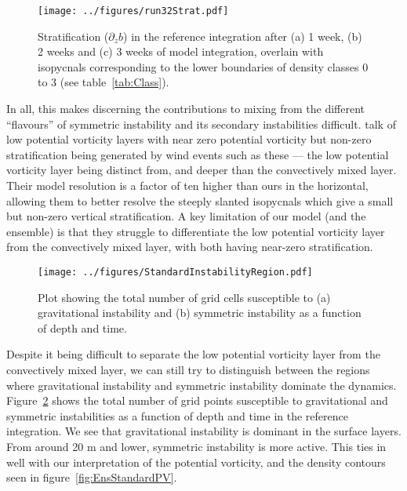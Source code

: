 
\begin{figure} 
    \centering
    \texttt{[image: ../figures/run32Strat.pdf]}
    \caption{Stratification ($\partial_z b$) in the reference integration after (a) 1 week, (b) 2 weeks and (c) 3 weeks of model integration, overlain with isopycnals corresponding to the lower boundaries of density classes 0 to 3 (see table~\ref{tab:Class}).}
    \label{fig:EnsStandardStrat}
\end{figure}

In all, this makes discerning the contributions to mixing from the different ``flavours'' of symmetric instability and its secondary instabilities difficult. \citet{Taylor2010} talk of low potential vorticity layers with near zero potential vorticity but non-zero stratification being generated by wind events such as these --- the low potential vorticity layer being distinct from, and deeper than the convectively mixed layer. Their model resolution is a factor of ten higher than ours in the horizontal, allowing them to better resolve the steeply slanted isopycnals which give a small but non-zero vertical stratification. A key limitation of our model (and the ensemble) is that they struggle to differentiate the low potential vorticity layer from the convectively mixed layer, with both having near-zero stratification.

\begin{figure}
    \centering
    \texttt{[image: ../figures/StandardInstabilityRegion.pdf]}
    \caption{Plot showing the total number of grid cells susceptible to (a) gravitational instability and (b) symmetric instability as a function of depth and time.}
    \label{fig:GravVsSym}
\end{figure}

Despite it being difficult to separate the low potential vorticity layer from the convectively mixed layer, we can still try to distinguish between the regions where gravitational instability and symmetric instability dominate the dynamics. Figure~\ref{fig:GravVsSym} shows the total number of grid points susceptible to gravitational and symmetric instabilities as a function of depth and time in the reference integration. We see that gravitational instability is dominant in the surface layers. From around 20 m and lower, symmetric instability is more active. This ties in well with our interpretation of the potential vorticity, and the density contours seen in figure~\ref{fig:EnsStandardPV}.

